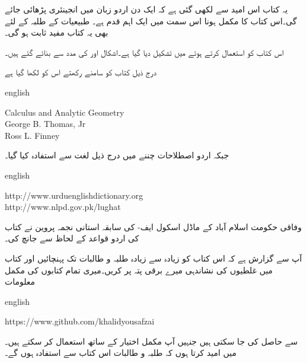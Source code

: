 یہ کتاب اس امید سے لکھی گئی ہے کہ ایک دن اردو زبان میں انجینئری پڑھائی جائے گی۔اس کتاب کا مکمل ہونا اس سمت میں ایک اہم قدم ہے۔ طبیعیات کے طلبہ کے لئے بھی یہ کتاب مفید ثابت ہو گی۔ 

اس کتاب کو  استعمال کرتے ہوئے  میں تشکیل دیا گیا ہے۔اشکال  اور  کی مدد سے بنائے گئے ہیں۔

درج ذیل کتاب کو سامنے رکھتے اس کو لکھا گیا ہے
{
\begin{otherlanguage*}{english}
\begin{LTR}
Calculus and Analytic Geometry\\
George B. Thomas, Jr\\
Ross L. Finney
\end{LTR}
\end{otherlanguage*}
}
جبکہ اردو اصطلاحات چننے میں درج ذیل لغت سے استفادہ  کیا گیا۔
{
\begin{otherlanguage*}{english}
\begin{LTR}
http:/\!\!/www.urduenglishdictionary.org\\
http:/\!\!/www.nlpd.gov.pk/lughat
\end{LTR}
\end{otherlanguage*}
}

وفاقی حکومت اسلام آباد   کے ماڈل اسکول ایف- کی سابقہ  استانی  نجمہ پروین نے   کتاب کی اردو قواعد  کے لحاظ سے  جانچ کی۔

آپ سے گزارش ہے کہ اس کتاب کو زیادہ سے زیادہ طلبہ و طالبات تک پہنچائیں اور کتاب میں غلطیوں کی نشاندہی میرے  برقی پتہ پر کریں۔میری تمام کتابوں کی مکمل  معلومات
{
\begin{otherlanguage*}{english}
\begin{LTR}
https:/\!\!/www.github.com/khalidyousafzai
\end{LTR}
\end{otherlanguage*}
}
سے حاصل کی جا سکتی ہیں جنہیں آپ مکمل اختیار کے ساتھ استعمال کر سکتے ہیں۔میں امید کرتا ہوں کہ طلبہ و طالبات اس کتاب سے استفادہ ہوں گے۔

\vspace{3mm}

{}


